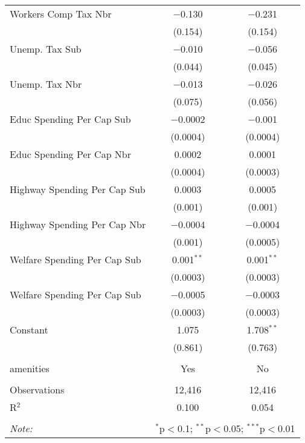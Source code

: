 \begin{table}[!htbp]
\begin{tabular}{@{\extracolsep{5pt}}lcc}
  Workers Comp Tax Nbr & $-$0.130 & $-$0.231 \\ 
  & (0.154) & (0.154) \\ 
  Unemp. Tax Sub & $-$0.010 & $-$0.056 \\ 
  & (0.044) & (0.045) \\ 
  Unemp. Tax Nbr & $-$0.013 & $-$0.026 \\ 
  & (0.075) & (0.056) \\ 
  Educ Spending Per Cap Sub & $-$0.0002 & $-$0.001 \\ 
  & (0.0004) & (0.0004) \\ 
  Educ Spending Per Cap Nbr & 0.0002 & 0.0001 \\ 
  & (0.0004) & (0.0003) \\ 
  Highway Spending Per Cap Sub & 0.0003 & 0.0005 \\ 
  & (0.001) & (0.001) \\ 
  Highway Spending Per Cap Nbr & $-$0.0004 & $-$0.0004 \\ 
  & (0.001) & (0.0005) \\ 
  Welfare Spending Per Cap Sub & 0.001$^{**}$ & 0.001$^{**}$ \\ 
  & (0.0003) & (0.0003) \\ 
  Welfare Spending Per Cap Sub & $-$0.0005 & $-$0.0003 \\ 
  & (0.0003) & (0.0003) \\ 
  Constant & 1.075 & 1.708$^{**}$ \\ 
  & (0.861) & (0.763) \\ 
 \hline \\[-1.8ex] 
amenities & Yes & No \\ 
\hline \\[-1.8ex] 
Observations & 12,416 & 12,416 \\ 
R$^{2}$ & 0.100 & 0.054 \\ 
\hline 
\hline \\[-1.8ex] 
\textit{Note:}  & \multicolumn{2}{r}{$^{*}$p$<$0.1; $^{**}$p$<$0.05; $^{***}$p$<$0.01} \\ 
\end{tabular} 
\end{table} 
